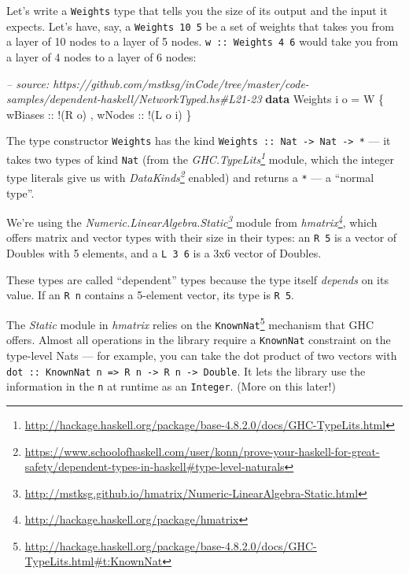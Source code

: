 \documentclass[]{article}
\newenvironment{Shaded}{}{}
\newcommand{\KeywordTok}[1]{\textcolor[rgb]{0.00,0.44,0.13}{\textbf{{#1}}}}
\newcommand{\DataTypeTok}[1]{\textcolor[rgb]{0.56,0.13,0.00}{{#1}}}
\newcommand{\CommentTok}[1]{\textcolor[rgb]{0.38,0.63,0.69}{\textit{{#1}}}}
\newcommand{\OtherTok}[1]{\textcolor[rgb]{0.00,0.44,0.13}{{#1}}}
\newcommand{\FunctionTok}[1]{\textcolor[rgb]{0.02,0.16,0.49}{{#1}}}
\newcommand{\NormalTok}[1]{{#1}}
\renewcommand{\href}[2]{#2\footnote{\url{#1}}}
\begin{document}
Let's write a \texttt{Weights} type that tells you the size of its output and
the input it expects. Let's have, say, a \texttt{Weights\ 10\ 5} be a set of
weights that takes you from a layer of 10 nodes to a layer of 5 nodes.
\texttt{w\ ::\ Weights\ 4\ 6} would take you from a layer of 4 nodes to a layer
of 6 nodes:

\begin{Shaded}
\begin{Highlighting}[]
\CommentTok{-- source: https://github.com/mstksg/inCode/tree/master/code-samples/dependent-haskell/NetworkTyped.hs#L21-23}
\KeywordTok{data} \DataTypeTok{Weights} \NormalTok{i o }\FunctionTok{=} \DataTypeTok{W} \NormalTok{\{}\OtherTok{ wBiases ::} \FunctionTok{!}\NormalTok{(}\DataTypeTok{R} \NormalTok{o)}
                     \NormalTok{,}\OtherTok{ wNodes  ::} \FunctionTok{!}\NormalTok{(}\DataTypeTok{L} \NormalTok{o i)}
                     \NormalTok{\}}
\end{Highlighting}
\end{Shaded}

The type constructor \texttt{Weights} has the kind
\texttt{Weights\ ::\ Nat\ -\textgreater{}\ Nat\ -\textgreater{}\ *} --- it takes
two types of kind \texttt{Nat} (from the
\emph{\href{http://hackage.haskell.org/package/base-4.8.2.0/docs/GHC-TypeLits.html}{GHC.TypeLits}}
module, which the integer type literals give us with
\emph{\href{https://www.schoolofhaskell.com/user/konn/prove-your-haskell-for-great-safety/dependent-types-in-haskell\#type-level-naturals}{DataKinds}}
enabled) and returns a \texttt{*} --- a ``normal type''.

We're using the
\emph{\href{http://mstksg.github.io/hmatrix/Numeric-LinearAlgebra-Static.html}{Numeric.LinearAlgebra.Static}}
module from \emph{\href{http://hackage.haskell.org/package/hmatrix}{hmatrix}},
which offers matrix and vector types with their size in their types: an
\texttt{R\ 5} is a vector of Doubles with 5 elements, and a \texttt{L\ 3\ 6} is
a 3x6 vector of Doubles.

These types are called ``dependent'' types because the type itself
\emph{depends} on its value. If an \texttt{R\ n} contains a 5-element vector,
its type is \texttt{R\ 5}.

The \emph{Static} module in \emph{hmatrix} relies on the
\href{http://hackage.haskell.org/package/base-4.8.2.0/docs/GHC-TypeLits.html\#t:KnownNat}{\texttt{KnownNat}}
mechanism that GHC offers. Almost all operations in the library require a
\texttt{KnownNat} constraint on the type-level Nats --- for example, you can
take the dot product of two vectors with
\texttt{dot\ ::\ KnownNat\ n\ =\textgreater{}\ R\ n\ -\textgreater{}\ R\ n\ -\textgreater{}\ Double}.
It lets the library use the information in the \texttt{n} at runtime as an
\texttt{Integer}. (More on this later!)
\end{document}
